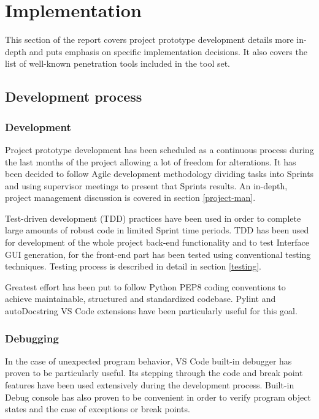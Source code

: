 

\section{Implementation}
This section of the report covers project prototype development details more in-depth and puts emphasis on specific implementation decisions. It also covers the list of well-known penetration tools included in the tool set.

\subsection{Development process}
	\subsubsection{Development}
	Project prototype development has been scheduled as a continuous process during the last months of the project allowing a lot of freedom for alterations. It has been decided to follow Agile development methodology dividing tasks into Sprints and using supervisor meetings to present that Sprints results. An in-depth, project management discussion is covered in section \ref{project-man}.
	
	Test-driven development (TDD) practices have been used in order to complete large amounts of robust code in limited Sprint time periods.  TDD has been used for development of the whole project back-end functionality and to test Interface GUI generation, for the front-end part has been tested using conventional testing techniques. Testing process is described in detail in section \ref{testing}.
	
	Greatest effort has been put to follow Python PEP8 coding conventions to achieve maintainable, structured and standardized codebase. Pylint and autoDocstring VS Code extensions have been particularly useful for this goal.
	
	\subsubsection{Debugging}
	In the case of unexpected program behavior, VS Code built-in debugger has proven to be particularly useful. Its stepping through the code and break point features have been used extensively during the development process. Built-in Debug console has also proven to be convenient in order to verify program object states and the case of exceptions or break points. 
	
